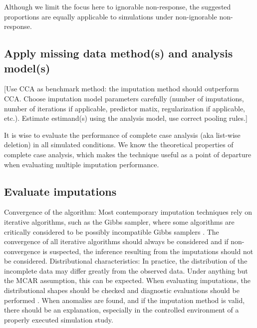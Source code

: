 \documentclass[bimj,fleqn]{w-art}
\theoremstyle{plain}
\theoremstyle{definition}
\begin{document}
Although we limit the focus here to ignorable non-response, the suggested proportions are equally applicable to simulations under non-ignorable non-response.
 


\subsection{Apply missing data method(s) and analysis model(s)}


[Use CCA as benchmark method: the imputation method should outperform CCA. Choose imputation model parameters carefully (number of imputations, number of iterations if applicable, predictor matix, regularization if applicable, etc.). Estimate estimand(s) using the analysis model, use correct pooling rules.]

It is wise to evaluate the performance of complete case analysis (aka list-wise deletion) in all simulated conditions. We know the theoretical properties of complete case analysis, which makes the technique useful as a point of departure when evaluating multiple imputation performance. 


\subsection{Evaluate imputations}


Convergence of the algorithm: Most contemporary imputation techniques rely on iterative algorithms, such as the Gibbs sampler, where some algorithms are critically considered to be possibly incompatible Gibbs samplers \citep[PIGS,][]{li2012imputing}. The convergence of all iterative algorithms should always be considered and if non-convergence is suspected, the inference resulting from the imputations should not be considered. 
Distributional characteristics: In practice, the distribution of the incomplete data may differ greatly from the observed data. Under anything but the MCAR assumption, this can be expected. When evaluating imputations, the distributional shapes should be checked and diagnostic evaluations should be performed \citep[see][for an detailed overview of diagnostic evaluation for multivariate imputations]{abayomi2008diagnostics}. When anomalies are found, and if the imputation method is valid, there should be an explanation, especially in the controlled environment of a properly executed simulation study. 
\end{document}
